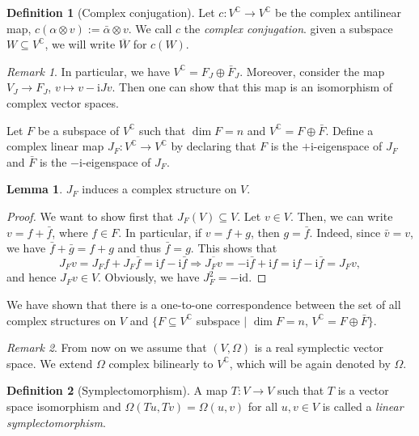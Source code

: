 \documentclass[12pt]{amsart}
\numberwithin{equation}{section}
\theoremstyle{plain}
\theoremstyle{definition}
\newtheorem{defn}{Definition}[subsection]
\newtheorem{lem}{Lemma}[subsection]
\theoremstyle{remark}
\newtheorem{rem}{Remark}[subsection]
\newcommand{\id}{\mathrm{id}}
\newcommand{\I}{\mathrm{i}}
\begin{document}
\begin{defn}[Complex conjugation]
Let $c\colon V^\mathbb{C}\to V^\mathbb{C}$ be the complex antilinear map, $c(\alpha\otimes v):=\bar\alpha\otimes v$. We call $c$ the \emph{complex conjugation}. given a subspace $W\subseteq V^\mathbb{C}$, we will write $\overline{W}$ for $c(W)$. 
\end{defn}

\begin{rem}
In particular, we have $V^\mathbb{C}=F_J\oplus \bar F_J$. Moreover, consider the map $V_J\to F_J$, $v\mapsto v-\I Jv$. Then one can show that this map is an isomorphism of complex vector spaces.
\end{rem}

Let $F$ be a subspace of $V^\mathbb{C}$ such that $\dim F=n$ and $V^\mathbb{C}=F\oplus \bar F$. Define a complex linear map $J_F\colon V^\mathbb{C}\to V^\mathbb{C}$ by declaring that $F$ is the $+\I$-eigenspace of $J_F$ and $\bar F$ is the $-\I$-eigenspace of $J_F$. 

\begin{lem}
$J_F$ induces a complex structure on $V$.
\end{lem}

\begin{proof}
We want to show first that $J_F(V)\subseteq V$. Let $v\in V$. Then, we can write $v=f+\bar f$, where $f\in F$. In particular, if $v=f+g$, then $g=\bar f$. Indeed, since $\bar v=v$, we have $\bar f+\bar g=f+g$ and thus $\bar f=g$. This shows that
$$J_Fv=J_Ff+J_F\bar f=\I f-\I \bar f\Rightarrow \overline{J_Fv}=-\I \bar f+\I f=\I f-\I \bar f=J_Fv,$$
and hence $J_Fv\in V$. Obviously, we have $J_F^2=-\id$.
\end{proof}

We have shown that there is a one-to-one correspondence between the set of all complex structures on $V$ and $\{F\subseteq V^\mathbb{C}$ subspace $\mid$ $\dim F=n$, $V^\mathbb{C}=F\oplus \bar F\}$. 

\begin{rem}
From now on we assume that $(V,\Omega)$ is a real symplectic vector space. We extend $\Omega$ complex bilinearly to $V^\mathbb{C}$, which will be again denoted by $\Omega$.
\end{rem}

\begin{defn}[Symplectomorphism]
A map $T\colon V\to V$ such that $T$ is a vector space isomorphism and $\Omega(Tu,Tv)=\Omega(u,v)$ for all $u,v\in V$ is called a \emph{linear symplectomorphism}.
\end{defn}
\end{document}
